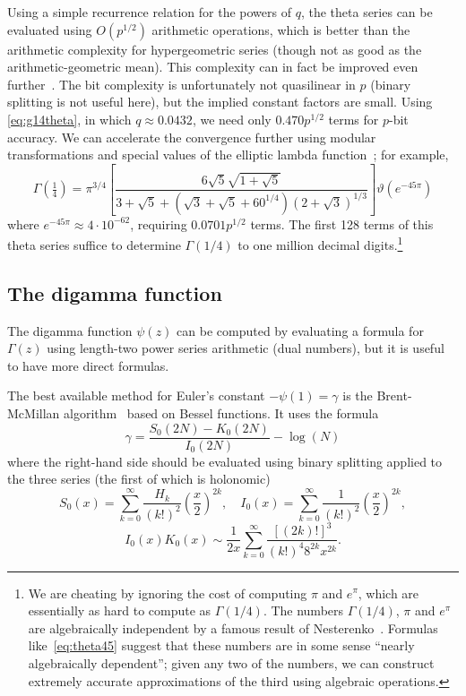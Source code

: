 \documentclass[reqno]{amsart}
\theoremstyle{definition}
\begin{document}
Using a simple recurrence relation for the powers of $q$,
the theta series can be evaluated using $O(p^{1/2})$ arithmetic
operations, which is better than the arithmetic complexity for hypergeometric series (though not as
good as the arithmetic-geometric mean).
This complexity can in fact be improved even further~\cite{enge2018short,Nogneng2017}.
The bit complexity is unfortunately not quasilinear in $p$ (binary splitting is not useful here),
but the implied constant factors are small.
Using \eqref{eq:g14theta}, in which $q \approx 0.0432$,
we need only $0.470 p^{1/2}$ terms for $p$-bit accuracy.
We can accelerate the convergence
further using modular transformations and special values
of the elliptic lambda function~\cite{Yi2004};
for example,
\begin{equation}
\Gamma(\tfrac{1}{4}) = \pi^{3/4} \left[\frac{6 \sqrt{5} \sqrt{1 + \sqrt{5}}}{3 + \sqrt{5} + \left(\sqrt{3} + \sqrt{5} + {60}^{1 / 4}\right) {\left(2 + \sqrt{3}\right)}^{1 / 3}}\right] \vartheta(e^{-45 \pi})
\label{eq:theta45}
\end{equation}
where $e^{-45 \pi} \approx 4 \cdot 10^{-62}$,
requiring $0.0701 p^{1/2}$ terms.
The first 128 terms of this theta series suffice to determine $\Gamma(1/4)$ to one million decimal digits.\footnote{We are cheating by ignoring
the cost of computing $\pi$ and $e^{\pi}$, which are essentially as hard to compute as $\Gamma(1/4)$. The numbers $\Gamma(1/4)$, $\pi$ and $e^{\pi}$ are algebraically independent by a famous result of Nesterenko~\cite{Nesterenko1996}.
Formulas like~\eqref{eq:theta45} suggest that these numbers are in some sense ``nearly algebraically dependent'';
given any two of the numbers, we can construct extremely accurate approximations of the third using algebraic operations.}

\subsection{The digamma function}

The digamma function $\psi(z)$ can be computed
by evaluating a formula for $\Gamma(z)$ using length-two power series arithmetic (dual numbers),
but it is useful to have more direct formulas.

The best available method for Euler's constant $-\psi(1) = \gamma$
is the Brent-McMillan
algorithm~\cite{BrentMcMillan1980} based on Bessel functions. It uses the formula
\begin{equation}
\gamma = \frac{S_0(2N) - K_0(2N)}{I_0(2N)} - \log(N)
\label{eq:brentmcmillan}
\end{equation}
where the right-hand side should be evaluated using binary splitting
applied to the three series (the first of which is holonomic)
\begin{equation}
S_0(x) = \sum_{k=0}^{\infty} \frac{H_k}{(k!)^2} \left(\frac{x}{2}\right)^{2k}, \quad
I_0(x) = \sum_{k=0}^{\infty} \frac{1}{(k!)^2} \left(\frac{x}{2}\right)^{2k},
\end{equation}
\begin{equation}
I_0(x) K_0(x) \sim \frac{1}{2x} \sum_{k=0}^{\infty} \frac{[(2k)!]^3}{(k!)^4 8^{2k} x^{2k}}.
\end{equation}
\end{document}
